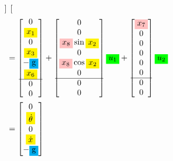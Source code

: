 \documentclass[12pt]{article}
\begin{document}
\begin{align*}
\begin{bmatrix}
    \end{bmatrix} \\
    &= \begin{bmatrix}
        0 \\
        \colorbox{yellow}{$x_1$} \\
        0 \\
        \colorbox{yellow}{$x_3$} \\
        -\colorbox{cyan}{g} \\
        \colorbox{yellow}{$x_6$} \\
        \hline
        0 \\
        0 \\
        \end{bmatrix} + \begin{bmatrix}
        0 \\
        0 \\
        \colorbox{pink}{$x_8$} \sin{\colorbox{yellow}{$x_2$}} \\
        0 \\
        \colorbox{pink}{$x_8$} \cos{\colorbox{yellow}{$x_2$}} \\
        0 \\
        \hline
        0 \\
        0 \\
    \end{bmatrix} \colorbox{green}{$u_1$} + \begin{bmatrix}
        \colorbox{pink}{$x_7$} \\
        0 \\
        0 \\
        0 \\
        0 \\
        0 \\
        \hline
        0 \\
        0 \\
    \end{bmatrix} \colorbox{green}{$u_2$} \\    
    &= \begin{bmatrix}
        0 \\
        \colorbox{yellow}{$\dot{\theta}$} \\
        0 \\
        \colorbox{yellow}{$\dot{x}$} \\
        -\colorbox{cyan}{g} \\

\end{bmatrix}
\end{align*}
\end{document}

